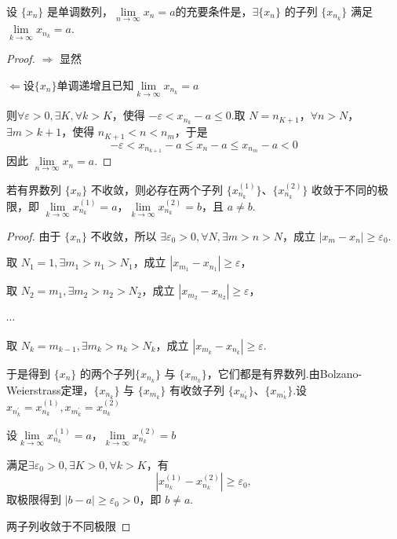 \begin{proposition}
	设 $\{x_n\}$ 是单调数列，$\lim\limits_{n \to \infty} x_n = a$的充要条件是，$\exists \{x_{n}\}$ 的子列 $\{x_{n_k}\}$ 满足 $\lim\limits_{k \to \infty} x_{n_k} = a$.
\end{proposition}
\begin{proof}
	$\Rightarrow$ 显然
	
	$\Leftarrow$设$\{x_n\}$单调递增且已知$\lim\limits_{k \to \infty} x_{n_k} = a$
	
	则$\forall \varepsilon > 0, \exists K, \forall k > K$，使得 $-\varepsilon < x_{n_k} - a \leqslant 0$.取 $N = n_{K + 1}$，$\forall n > N$，
	$\exists m > k + 1$，使得 $n_{K+1} < n < n_m$，于是
	\[
	-\varepsilon < x_{n_{k+1}} - a \leqslant x_n - a \leqslant x_{n_m} - a < 0
	\]
	因此 $\lim\limits_{n \to \infty} x_n = a$.
\end{proof}
\begin{proposition}
	若有界数列 $\{x_n\}$ 不收敛，则必存在两个子列 $\{x_{n_k}^{(1)}\}$、$\{x_{n_k}^{(2)}\}$ 收敛于不同的极限，即 $\lim\limits_{k \to \infty} x_{n_k}^{(1)} = a$，$\lim\limits_{k \to \infty} x_{n_k}^{(2)} = b$，且 $a \neq b$.
	
	
\end{proposition}
\begin{proof}
	由于 $\{x_n\}$ 不收敛，所以 $\exists \varepsilon_0 > 0, \forall N, \exists m>n > N$，成立 $|x_m - x_n| \geqslant \varepsilon_0$.
	
	取 $N_1 = 1, \exists m_1> n_1 > N_1$，成立 $|x_{m_1} - x_{n_1}| \geqslant \varepsilon$，
	
	取 $N_2 = m_1, \exists m_2>n_2 > N_2$，成立 $|x_{m_2} - x_{n_2}| \geqslant \varepsilon$，
	
	$\cdots$
	
	取 $N_k = m_{k-1}, \exists m_k>n_k > N_k$，成立 $|x_{m_k} - x_{n_k}| \geqslant \varepsilon$.
	
	于是得到 $\{x_n\}$ 的两个子列$\{x_{n_k}\}$ 与 $\{x_{m_k}\}$，它们都是有界数列.由Bolzano-Weierstrass定理，$\{x_{n_k}\}$ 与 $\{x_{m_k}\}$ 有收敛子列 $\{x_{n_{k}^{\prime}}\}$、$\{x_{m_{k}^{\prime}}\}$.设$x_{n_{k}^{\prime}}=x_{n_k}^{(1)},x_{m_{k}^{\prime}}=x_{n_k}^{(2)}$
	
	设$\lim\limits_{k \to \infty} x_{n_k}^{(1)} = a$，$\lim\limits_{k \to \infty} x_{n_k}^{(2)} = b$
	
	满足$\exists \varepsilon_0 > 0, \exists K>0, \forall k > K$，有
	\[
	|x_{n_{k}}^{(1)} - x_{n_{k}}^{(2)}| \geqslant \varepsilon_0,
	\]
	取极限得到 $|b - a| \geqslant \varepsilon_0 > 0$，即 $b \neq a$.
	
	两子列收敛于不同极限
\end{proof}
